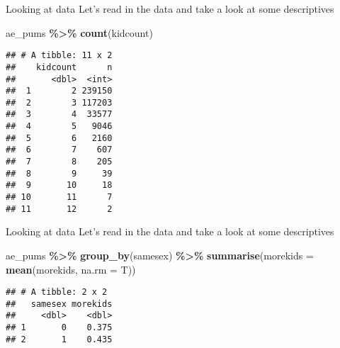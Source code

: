 \documentclass[
  ignorenonframetext,
]{beamer}
\newenvironment{Shaded}{\begin{snugshade}}{\end{snugshade}}
\newcommand{\AttributeTok}[1]{\textcolor[rgb]{0.13,0.29,0.53}{#1}}
\newcommand{\FunctionTok}[1]{\textcolor[rgb]{0.13,0.29,0.53}{\textbf{#1}}}
\newcommand{\NormalTok}[1]{#1}
\newcommand{\SpecialCharTok}[1]{\textcolor[rgb]{0.81,0.36,0.00}{\textbf{#1}}}
\begin{document}
\begin{frame}[fragile]{Looking at data}
\label{looking-at-data-1}
Let's read in the data and take a look at some descriptives

\scriptsize

\begin{Shaded}
\begin{Highlighting}[]
\NormalTok{ae\_pums }\SpecialCharTok{\%\textgreater{}\%}
  \FunctionTok{count}\NormalTok{(kidcount)}
\end{Highlighting}
\end{Shaded}

\begin{verbatim}
## # A tibble: 11 x 2
##    kidcount      n
##       <dbl>  <int>
##  1        2 239150
##  2        3 117203
##  3        4  33577
##  4        5   9046
##  5        6   2160
##  6        7    607
##  7        8    205
##  8        9     39
##  9       10     18
## 10       11      7
## 11       12      2
\end{verbatim}
\end{frame}

\begin{frame}[fragile]{Looking at data}
\label{looking-at-data-2}
Let's read in the data and take a look at some descriptives

\scriptsize

\begin{Shaded}
\begin{Highlighting}[]
\NormalTok{ae\_pums }\SpecialCharTok{\%\textgreater{}\%}
  \FunctionTok{group\_by}\NormalTok{(samesex) }\SpecialCharTok{\%\textgreater{}\%}
  \FunctionTok{summarise}\NormalTok{(}\AttributeTok{morekids =} \FunctionTok{mean}\NormalTok{(morekids, }\AttributeTok{na.rm =}\NormalTok{ T))}
\end{Highlighting}
\end{Shaded}

\begin{verbatim}
## # A tibble: 2 x 2
##   samesex morekids
##     <dbl>    <dbl>
## 1       0    0.375
## 2       1    0.435
\end{verbatim}
\end{frame}
\end{document}
